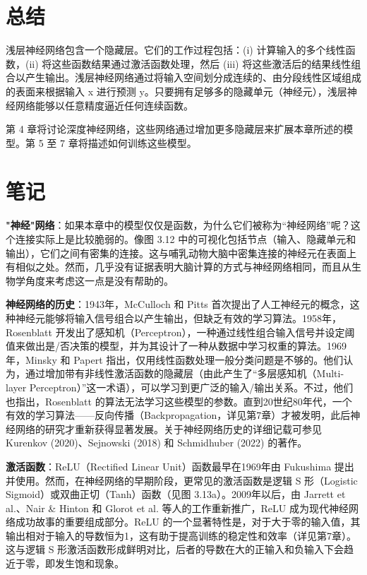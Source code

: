 \documentclass[lang=cn,newtx,10pt,scheme=chinese]{elegantbook}
\begin{document}
\section{总结}
浅层神经网络包含一个隐藏层。它们的工作过程包括：(i) 计算输入的多个线性函数，(ii) 将这些函数结果通过激活函数处理，然后 (iii) 将这些激活后的结果线性组合以产生输出。浅层神经网络通过将输入空间划分成连续的、由分段线性区域组成的表面来根据输入 x 进行预测 y。只要拥有足够多的隐藏单元（神经元），浅层神经网络能够以任意精度逼近任何连续函数。

第 4 章将讨论深度神经网络，这些网络通过增加更多隐藏层来扩展本章所述的模型。第 5 至 7 章将描述如何训练这些模型。

\section{笔记}

\textbf{"神经"网络}：如果本章中的模型仅仅是函数，为什么它们被称为“神经网络”呢？这个连接实际上是比较脆弱的。像图 3.12 中的可视化包括节点（输入、隐藏单元和输出），它们之间有密集的连接。这与哺乳动物大脑中密集连接的神经元在表面上有相似之处。然而，几乎没有证据表明大脑计算的方式与神经网络相同，而且从生物学角度来考虑这一点是没有帮助的。

\textbf{神经网络的历史}：1943年，McCulloch 和 Pitts 首次提出了人工神经元的概念，这种神经元能够将输入信号组合以产生输出，但缺乏有效的学习算法。1958年，Rosenblatt 开发出了感知机（Perceptron），一种通过线性组合输入信号并设定阈值来做出是/否决策的模型，并为其设计了一种从数据中学习权重的算法。1969年，Minsky 和 Papert 指出，仅用线性函数处理一般分类问题是不够的。他们认为，通过增加带有非线性激活函数的隐藏层（由此产生了“多层感知机（Multi-layer Perceptron）”这一术语），可以学习到更广泛的输入/输出关系。不过，他们也指出，Rosenblatt 的算法无法学习这些模型的参数。直到20世纪80年代，一个有效的学习算法——反向传播（Backpropagation，详见第7章）才被发明，此后神经网络的研究才重新获得显著发展。关于神经网络历史的详细记载可参见 Kurenkov (2020)、Sejnowski (2018) 和 Schmidhuber (2022) 的著作。

\textbf{激活函数}：ReLU（Rectified Linear Unit）函数最早在1969年由 Fukushima 提出并使用。然而，在神经网络的早期阶段，更常见的激活函数是逻辑 S 形（Logistic Sigmoid）或双曲正切（Tanh）函数（见图 3.13a）。2009年以后，由 Jarrett et al.、Nair \& Hinton 和 Glorot et al. 等人的工作重新推广，ReLU 成为现代神经网络成功故事的重要组成部分。ReLU 的一个显著特性是，对于大于零的输入值，其输出相对于输入的导数恒为1，这有助于提高训练的稳定性和效率（详见第7章）。这与逻辑 S 形激活函数形成鲜明对比，后者的导数在大的正输入和负输入下会趋近于零，即发生饱和现象。
\end{document}
